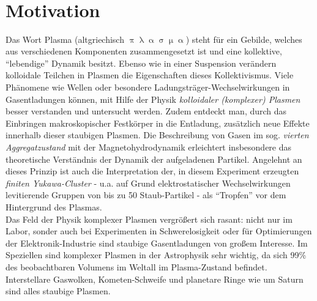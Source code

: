 \documentclass[numbers=noenddot,a4paper,notitlepage,twoside,BCOR15mm]{scrbook}
\newcommand{\tilt}[1]{\textit{#1}}
\begin{document}
	\thispagestyle{empty}

	\newpage
	\thispagestyle{empty}
	\begin{align*}
	\,
	\end{align*}
	\newpage

	\tableofcontents

	\newpage

	\chapter{Motivation}\label{sec:einleitung}

		Das Wort Plasma (altgriechisch $\uppi\uplambda\upalpha\upsigma\upmu\upalpha$) steht für ein Gebilde, welches aus verschiedenen Komponenten zusammengesetzt ist und eine kollektive, "`lebendige"' Dynamik besitzt. Ebenso wie in einer Suspension verändern kolloidale Teilchen in Plasmen die Eigenschaften dieses Kollektivismus. Viele Phänomene wie Wellen oder besondere Ladungsträger-Wechselwirkungen in Gasentladungen können, mit Hilfe der Physik \tilt{kolloidaler (komplexer) Plasmen} besser verstanden und untersucht werden. Zudem entdeckt man, durch das Einbringen makroskopischer Festkörper in die Entladung, zusätzlich neue Effekte innerhalb dieser staubigen Plasmen. Die Beschreibung von Gasen im sog. \tilt{vierten Aggregatzustand} mit der Magnetohydrodynamik erleichtert insbesondere das theoretische Verständnis der Dynamik der aufgeladenen Partikel. Angelehnt an dieses Prinzip ist auch die Interpretation der, in diesem Experiment erzeugten \tilt{finiten Yukawa-Cluster} - u.a. auf Grund elektrostatischer Wechselwirkungen levitierende Gruppen von bis zu 50 Staub-Partikel - als "`Tropfen"' vor dem Hintergrund des Plasmas.\\
		Das Feld der Physik komplexer Plasmen vergrößert sich rasant: nicht nur im Labor, sonder auch bei Experimenten in Schwerelosigkeit oder für Optimierungen der Elektronik-Industrie sind staubige Gasentladungen von großem Interesse. Im Speziellen sind komplexer Plasmen in der Astrophysik sehr wichtig, da sich 99\% des beobachtbaren Volumens im Weltall im Plasma-Zustand befindet. Interstellare Gaswolken, Kometen-Schweife und planetare Ringe wie um Saturn sind alles staubige Plasmen.\\
\end{document}
